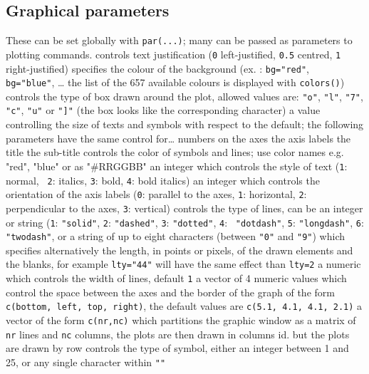 \subsection{Graphical parameters}{These can be set globally with {\tt par(...)}; many can be passed as
parameters to plotting commands.}
	{controls text justification ({\tt 0} left-justified, {\tt 0.5}
centred, {\tt 1} right-justified)}
	{specifies the colour of the background (ex. : {\tt bg="red"}, {\tt
bg="blue"}, \ldots{} the list of the 657 available colours is displayed with
{\tt colors()})}
	{controls the type of box drawn around the plot, allowed values
 are: {\tt "o"}, {\tt "l"}, {\tt "7"}, {\tt "c"}, {\tt "u"} or {\tt "]"} (the box looks like the corresponding character)}
	{ a value controlling the size of texts and symbols with respect to
the default; the following parameters have the same control for\ldots}
 {numbers on the axes}
 {the axis labels}
 {the title}
 {the sub-title}
	{controls the color of symbols and lines; use color names e.g. "red", "blue" or as "\#RRGGBB"}
	{an integer which controls the style of text ({\tt 1}: normal, {\tt
2}: italics, {\tt 3}: bold, {\tt 4}: bold italics)}
	{ an integer which controls the orientation of the axis labels ({\tt 0}: parallel to the axes, {\tt 1}: horizontal, {\tt 2}: perpendicular to the axes, {\tt 3}: vertical)}
	{controls the type of lines, can be an integer or string ({\tt 1}:
{\tt "solid"}, {\tt 2}: {\tt "dashed"}, {\tt 3}: {\tt "dotted"}, {\tt 4}: {\tt
"dotdash"}, {\tt 5}: {\tt "longdash"}, {\tt 6}: {\tt "twodash"}, or a string of
up to eight characters (between {\tt "0"} and {\tt "9"}) which specifies
alternatively the length, in points or pixels, of the drawn elements and the
blanks, for example {\tt lty="44"} will have the same effect than {\tt lty=2}}
	{ a numeric which controls the width of lines, default {\tt 1}}
	{ a vector of 4 numeric values which control the space between the
axes and the border of the graph of the form {\tt c(bottom, left, top, right)},
the default values are {\tt c(5.1, 4.1, 4.1, 2.1)}}
	{a vector of the form {\tt c(nr,nc)} which partitions the
graphic window as a matrix of {\tt nr} lines and {\tt nc} columns, the plots
are then drawn in columns}
	{ id. but the plots are drawn by row}
	{ controls the type of symbol, either an integer between 1 and 25,
or any single character within {\tt ""}}

